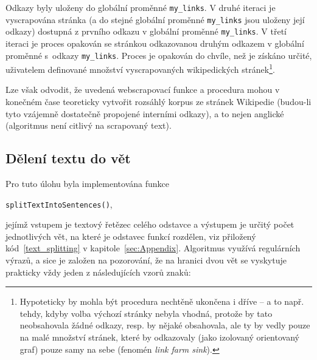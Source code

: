 Odkazy byly uloženy do globální proměnné \texttt{my\_links}. V druhé
iteraci je vyscrapována stránka (a do stejné globální proměnné \texttt{my\_links} jsou
uloženy její odkazy) dostupná z prvního odkazu v globální proměnné \texttt{my\_links}.
V třetí iteraci je proces opakován se stránkou odkazovanou druhým odkazem
v globální proměnné s~odkazy \texttt{my\_links}. Proces je opakován do
chvíle, než je získáno určité, uživatelem definované množství vyscrapovaných
wikipedických stránek\footnote{Hypoteticky by mohla být procedura nechtěně
ukončena i dříve -- a to např. tehdy, kdyby volba výchozí stránky nebyla
vhodná, protože by tato neobsahovala žádné odkazy, resp. by nějaké
obsahovala, ale ty by vedly pouze na malé množství stránek, které by
odkazovaly (jako izolovaný orientovaný graf) pouze samy na sebe
(fenomén \textit{link farm sink}).}.

Lze však odvodit, že uvedená webscrapovací funkce a procedura mohou v konečném
čase teoreticky vytvořit rozsáhlý korpus ze stránek Wikipedie (budou-li
tyto vzájemně dostatečně propojené interními odkazy), a to nejen anglické
(algoritmus není citlivý na scrapovaný text).


\subsection{Dělení textu do vět}

Pro tuto úlohu byla implementována funkce 

\begin{center}
\texttt{splitTextIntoSentences()},
\end{center}

\noindent jejímž vstupem je textový řetězec celého odstavce a výstupem je určitý počet
jednotlivých vět, na které je odstavec funkcí rozdělen, viz přiložený
kód~\ref{text_splitting} v kapitole~\ref{sec:Appendix}.
Algoritmus využívá regulárních výrazů,
a sice je založen na pozorování, že na
hranici dvou vět se vyskytuje prakticky vždy jeden z následujících vzorů
znaků:

